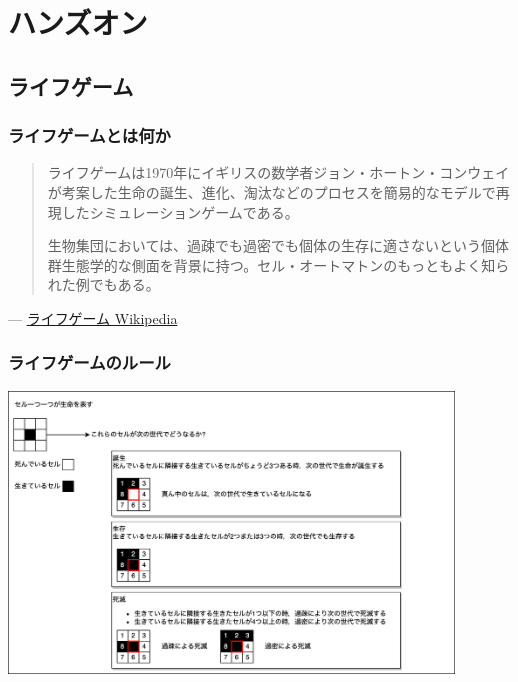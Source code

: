 \documentclass[aspectratio=169]{beamer}
\begin{document}
\section{ハンズオン}
\subsection{ライフゲーム}
\begin{frame}\frametitle{ライフゲームとは何か}
  \begin{quote}
    ライフゲームは1970年にイギリスの数学者ジョン・ホートン・コンウェイが考案した生命の誕生、進化、淘汰などのプロセスを簡易的なモデルで再現したシミュレーションゲームである。

    生物集団においては、過疎でも過密でも個体の生存に適さないという個体群生態学的な側面を背景に持つ。セル・オートマトンのもっともよく知られた例でもある。
  \end{quote}
  \begin{flushright}
    ---
    \href{https://ja.wikipedia.org/wiki/\%E3\%83\%A9\%E3\%82\%A4\%E3\%83\%95\%E3\%82\%B2\%E3\%83\%BC\%E3\%83\%A0}{ライフゲーム Wikipedia}
  \end{flushright}
\end{frame}

\begin{frame}\frametitle{ライフゲームのルール}
  \begin{center}
    \includegraphics[height=7.5cm]{asset/lifegame.png}
  \end{center}
\end{frame}
\end{document}
